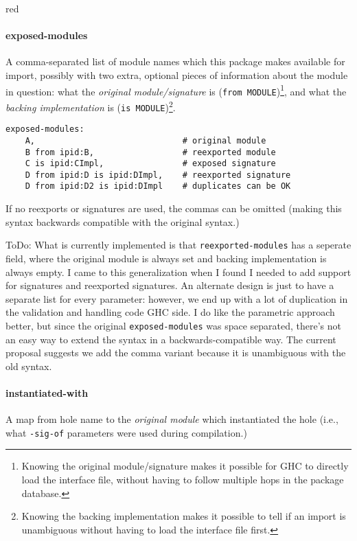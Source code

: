 \documentclass{article}
\begin{document}
\begin{color}{red}

\paragraph{exposed-modules} A comma-separated list of
module names which this package makes available for import, possibly with two extra, optional pieces of information
about the module in question: what the \emph{original module/signature}
is (\texttt{from MODULE})\footnote{Knowing the original module/signature
makes it possible for GHC to directly load the interface file, without
having to follow multiple hops in the package database.}, and what the
\emph{backing implementation} is (\texttt{is MODULE})\footnote{Knowing
the backing implementation makes it possible to tell if an import is
unambiguous without having to load the interface file first.}.

\begin{verbatim}
exposed-modules:
    A,                              # original module
    B from ipid:B,                  # reexported module
    C is ipid:CImpl,                # exposed signature
    D from ipid:D is ipid:DImpl,    # reexported signature
    D from ipid:D2 is ipid:DImpl    # duplicates can be OK
\end{verbatim}

If no reexports or signatures are used, the commas can be omitted
(making this syntax backwards compatible with the original syntax.)

ToDo: What is currently implemented is
that \texttt{reexported-modules} has a seperate field, where the
original module is always set and backing implementation is always empty.
I came to this generalization when I found I needed to add support for
signatures and reexported signatures.  An alternate design is just to
have a separate list for every parameter: however, we end up with a lot
of duplication in the validation and handling code GHC side.  I do like
the parametric approach better, but since the original
\texttt{exposed-modules} was space separated, there's not an easy way to
extend the syntax in a backwards-compatible way.  The current proposal
suggests we add the comma variant because it is unambiguous with the old
syntax.
\end{color}

\paragraph{instantiated-with} A map from hole name to the \emph{original
module} which instantiated the hole (i.e., what \texttt{-sig-of}
parameters were used during compilation.)
\end{document}

